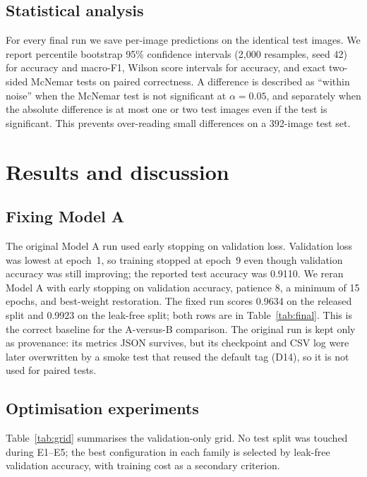 \documentclass[11pt,a4paper]{article}
\begin{document}
\subsection{Statistical analysis}
For every final run we save per-image predictions on the identical test
images. We report percentile bootstrap 95\% confidence intervals (2,000
resamples, seed 42) for accuracy and macro-F1, Wilson score intervals for
accuracy, and exact two-sided McNemar tests on paired correctness. A difference
is described as ``within noise'' when the McNemar test is not significant at
$\alpha=0.05$, and separately when the absolute difference is at most one or
two test images even if the test is significant. This prevents over-reading
small differences on a 392-image test set.

\section{Results and discussion}
\subsection{Fixing Model A}
The original Model A run used early stopping on validation loss. Validation
loss was lowest at epoch~1, so training stopped at epoch~9 even though
validation accuracy was still improving; the reported test accuracy was 0.9110.
We reran Model A with early stopping on validation accuracy, patience 8, a
minimum of 15 epochs, and best-weight restoration. The fixed run scores 0.9634
on the released split and 0.9923 on the leak-free split; both rows are in
Table~\ref{tab:final}. This is the correct baseline for the A-versus-B
comparison. The original run is kept only as provenance: its metrics JSON
survives, but its checkpoint and CSV log were later overwritten by a smoke test
that reused the default tag (D14), so it is not used for paired tests.

\subsection{Optimisation experiments}
Table~\ref{tab:grid} summarises the validation-only grid. No test split was
touched during E1--E5; the best configuration in each family is selected by
leak-free validation accuracy, with training cost as a secondary criterion.

\begin{table}[H]\centering\small
\caption{Validation-only optimisation grid. E1 uses 8+8 epochs; E2--E4 use the
same 6+6 budget and the E2 reference (MobileNetV2, Adam, matched learning
rates); E5 uses an 8-epoch budget. Best epoch is the epoch of best validation
accuracy.}
\label{tab:grid}\end{table}
\end{document}
